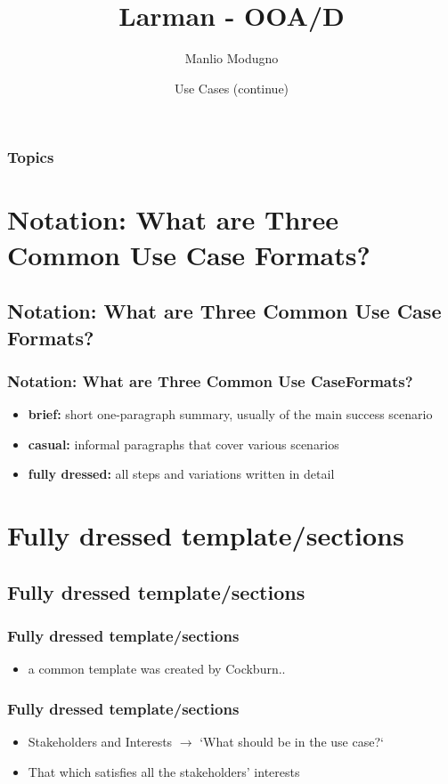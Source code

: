 \documentclass{beamer}
\title{Larman - OOA/D}
\author{Manlio Modugno}
\institute[GMTechnologies]
\date[]{Use Cases (continue)}
\begin{document}
\begin{frame}
  \titlepage
\end{frame}

\begin{frame}
  \frametitle{Topics}
  \tableofcontents
\end{frame}


\section{Notation: What are Three Common Use Case Formats?}
\subsection{Notation: What are Three Common Use Case Formats?}
\begin{frame}
  \frametitle{Notation: What are Three Common Use CaseFormats?}
  \begin{itemize}
	\item<+-> \textbf{brief:} short one-paragraph summary, usually of the main success scenario
	\item<+-> \textbf{casual:} informal paragraphs that cover various scenarios
	\item<+-> \textbf{fully dressed:} all steps and variations written in detail
   \end{itemize}
\end{frame}

\section{Fully dressed template/sections}
\subsection{Fully dressed template/sections}
\begin{frame}
  \frametitle{Fully dressed template/sections}
  \begin{itemize}
	\item<+-> a common template was created by Cockburn..
   \end{itemize}
\end{frame}


\begin{frame}
  \frametitle{Fully dressed template/sections}
  \begin{itemize}
	\item<+-> Stakeholders and Interests $ \rightarrow $ `What should be in the use case?`
	\item<+-> That which satisfies all the stakeholders' interests
   \end{itemize}
\end{frame}
\end{document}
